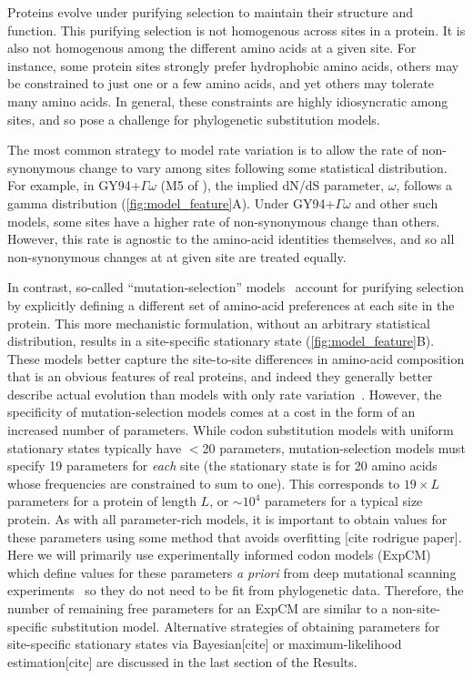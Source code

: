 \documentclass[11pt]{article}
\newcommand\skhcomment[1]{{\color{cyan}[#1]}}
\begin{document}
Proteins evolve under purifying selection to maintain their structure and function. 
This purifying selection is not homogenous across sites in a protein.
It is also not homogenous among the different amino acids at a given site.
For instance, some protein sites strongly prefer hydrophobic amino acids, others may be constrained to just one or a few amino acids, and yet others may tolerate many amino acids.
In general, these constraints are highly idiosyncratic among sites, and so pose a challenge for phylogenetic substitution models.

The most common strategy to model rate variation is to allow the rate of non-synonymous change to vary among sites following some statistical distribution.
For example, in GY94+$\Gamma\omega$ (M5 of \cite{yang2000codon}), the implied dN/dS parameter, $\omega$, follows a gamma distribution (\ref{fig:model_feature}A).
Under GY94+$\Gamma\omega$ and other such models, some sites have a higher rate of non-synonymous change than others. 
However, this rate is agnostic to the amino-acid identities themselves, and so all non-synonymous changes at at given site are treated equally. 

In contrast, so-called ``mutation-selection'' models~\citep{halpern1998evolutionary} account for purifying selection by explicitly defining a different set of amino-acid preferences at each site in the protein. 
This more mechanistic formulation, without an arbitrary statistical distribution, results in a site-specific stationary state (\ref{fig:model_feature}B). 
These models better capture the site-to-site differences in amino-acid composition that is an obvious features of real proteins, and indeed they generally better describe actual evolution than models with only rate variation~\citep{lartillot2004bayesian, le2008phylogenetic, rodrigue2010mutation,hilton2017phydms,bloom2014experimentally}.
However, the specificity of mutation-selection models comes at a cost in the form of an increased number of parameters. 
While codon substitution models with uniform stationary states typically have $<$20 parameters, mutation-selection models must specify 19 parameters for \emph{each} site (the stationary state is for 20 amino acids whose frequencies are constrained to sum to one).
This corresponds to $19\times L$ parameters for a protein of length $L$, or $\sim 10^4$ parameters for a typical size protein.
As with all parameter-rich models, it is important to obtain values for these parameters using some method that avoids overfitting \skhcomment{cite rodrigue paper}.
Here we will primarily use experimentally informed codon models (ExpCM)~\citep{bloom2014experimentally, hilton2017phydms, bloom2017identification} which define values for these parameters \textit{a priori} from deep mutational scanning experiments~\citep{araya2011,fowler2010high} so they do not need to be fit from phylogenetic data.
Therefore, the number of remaining free parameters for an ExpCM are similar to a non-site-specific substitution model.
Alternative strategies of obtaining parameters for site-specific stationary states via Bayesian\skhcomment{cite} or maximum-likelihood estimation\skhcomment{cite} are discussed in the last section of the Results.
\end{document}
